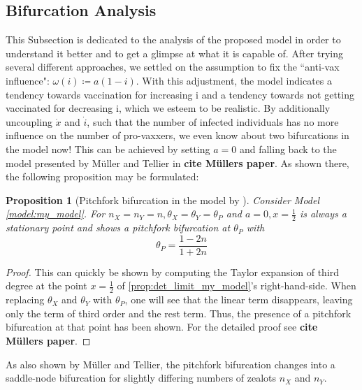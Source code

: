 \documentclass[12pt,a4paper,twoside]{article}
\newtheorem{prop}{Proposition}[section]
\begin{document}
\subsection{Bifurcation Analysis}
This Subsection is dedicated to the analysis of the proposed model in order to understand it better and to get a glimpse at what it is capable of. After trying several different approaches, we settled on the assumption to fix the ``anti-vax influence": $\omega\left(i\right) \coloneqq a\left(1-i\right)$. With this adjustment, the model indicates a tendency towards vaccination for increasing i and a tendency towards not getting vaccinated for decreasing i, which we esteem to be realistic. By additionally uncoupling $\dot{x}$ and $\dot{i}$, such that the number of infected individuals has no more influence on the number of pro-vaxxers, we even know about two bifurcations in the model now! This can be achieved by setting $a = 0$ and falling back to the model presented by M\"uller and Tellier in \textbf{cite M\"ullers paper}. As shown there, the following proposition may be formulated:

\begin{prop}[Pitchfork bifurcation in the model by \cite{JohannesMuller2020}]\label{prop:mueller_stat_point}
	Consider Model \ref{model:my_model}. For $n_X = n_Y = n, \theta_X = \theta_Y = \theta_P$ and $a = 0, x = \frac{1}{2}$ is always a stationary point and shows a pitchfork bifurcation at $\theta_P$ with
	\begin{equation*}
		\theta_P = \frac{1-2n}{1+2n}
	\end{equation*}
\end{prop}
\begin{proof}
	This can quickly be shown by computing the Taylor expansion of third degree at the point $x = \frac{1}{2}$ of \eqref{prop:det_limit_my_model}'s right-hand-side. When replacing $\theta_X$ and $\theta_Y$ with $\theta_P$, one will see that the linear term disappears, leaving only the term of third order and the rest term. Thus, the presence of a pitchfork bifurcation at that point has been shown. For the detailed proof see \textbf{cite M\"ullers paper}.
\end{proof}

As also shown by M\"uller and Tellier, the pitchfork bifurcation changes into a saddle-node bifurcation for slightly differing numbers of zealots $n_X$ and $n_Y$. 
\end{document}
